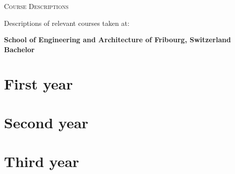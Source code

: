 \documentclass[12pt]{article}
\newcommand*{\heia}{School of Engineering and Architecture of Fribourg}
\begin{document}
\textsc{\LARGE Course Descriptions}\\%
\large{Descriptions of relevant courses taken at:
\begin{center}
    \textbf{\heia{}, Switzerland\\Bachelor}
\end{center}}


%
%
\section{First year}





















%
%
\section{Second year}




















%
%
\section{Third year}


















\end{document}
